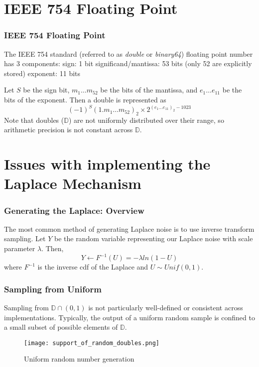 \documentclass{beamer}
\begin{document}
\section{IEEE 754 Floating Point}
\begin{frame}
    \frametitle{IEEE 754 Floating Point}
    The IEEE 754 standard (referred to as \emph{double} or \emph{binary64}) floating point number has 3 components: \newline
    sign: 1 bit \newline
    significand/mantissa: 53 bits (only 52 are explicitly stored) \newline
    exponent: 11 bits

    Let $S$ be the sign bit, $m_{1} \hdots m_{52}$ be the bits of the mantissa, and $e_{1} \hdots e_{11}$ be the bits of the exponent. Then a double is represented as
\[ (-1)^S (1.m_{1} \hdots m_{52})_{2} \times 2^{(e_1 \hdots e_{11})_2 - 1023} \]
    Note that doubles ($\mathbb{D}$) are not uniformly distributed over their range, so arithmetic precision is not constant across $\mathbb{D}$.
\end{frame}

\section{Issues with implementing the Laplace Mechanism}
\begin{frame}
    \frametitle{Generating the Laplace: Overview}
    The most common method of generating Laplace noise is to use inverse transform sampling. Let $Y$ be the random variable representing our Laplace noise with scale parameter $\lambda$. Then,
    \[ Y \leftarrow F^{-1}(U) = -\lambda ln (1-U) \]
    where $F^{-1}$ is the inverse cdf of the Laplace and $U \sim Unif(0,1)$. \newline
\end{frame}

\begin{frame}
    \frametitle{Sampling from Uniform}
    Sampling from $\mathbb{D} \cap (0,1)$ is not particularly well-defined or consistent across implementations. Typically, the output of a uniform random sample is confined to a small subset of possible elements of $\mathbb{D}$. \cite{Mir2012}  
    \begin{figure}
        \texttt{[image: support\_of\_random\_doubles.png]}
        \caption{Uniform random number generation \cite{Mir2012}}
    \end{figure}
\end{frame}
\end{document}
